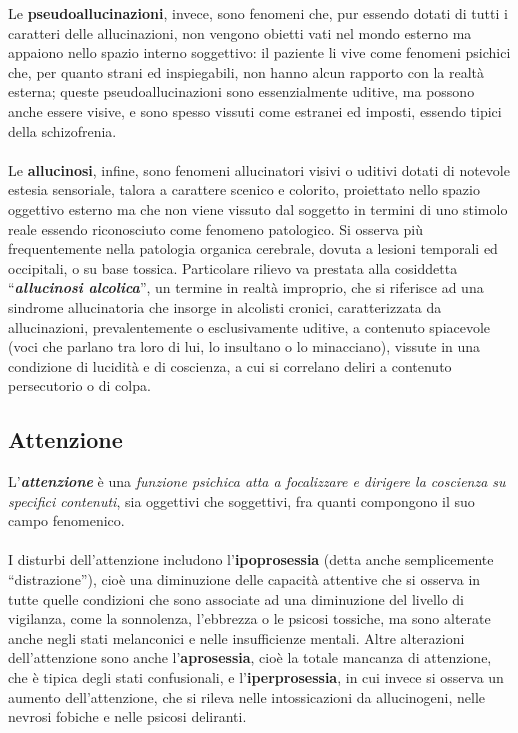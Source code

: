Le \textbf{pseudoallucinazioni}, invece, sono fenomeni che, pur essendo
dotati di tutti i caratteri delle allucinazioni, non vengono obietti
vati nel mondo esterno ma appaiono nello spazio interno soggettivo: il
paziente li vive come fenomeni psichici che, per quanto strani ed
inspiegabili, non hanno alcun rapporto con la realtà esterna; queste
pseudoallucinazioni sono essenzialmente uditive, ma possono anche essere
visive, e sono spesso vissuti come estranei ed imposti, essendo tipici
della schizofrenia.
\\\\
Le \textbf{allucinosi}, infine, sono fenomeni allucinatori visivi o
uditivi dotati di notevole estesia sensoriale, talora a carattere
scenico e colorito, proiettato nello spazio oggettivo esterno ma che non
viene vissuto dal soggetto in termini di uno stimolo reale essendo
riconosciuto come fenomeno patologico. Si osserva più frequentemente
nella patologia organica cerebrale, dovuta a lesioni temporali ed
occipitali, o su base tossica. Particolare rilievo va prestata alla
cosiddetta ``\textbf{\emph{allucinosi alcolica}}'', un termine in realtà
improprio, che si riferisce ad una sindrome allucinatoria che insorge in
alcolisti cronici, caratterizzata da allucinazioni, prevalentemente o
esclusivamente uditive, a contenuto spiacevole (voci che parlano tra
loro di lui, lo insultano o lo minacciano), vissute in una condizione di
lucidità e di coscienza, a cui si correlano deliri a contenuto
persecutorio o di colpa.

\subsection{Attenzione}

L'\textbf{\emph{attenzione}} è una \emph{funzione psichica atta a
focalizzare e dirigere la coscienza su specifici contenuti}, sia
oggettivi che soggettivi, fra quanti compongono il suo campo fenomenico.
\\\\
I disturbi dell'attenzione includono l'\textbf{ipoprosessia} (detta
anche semplicemente ``distrazione''), cioè una diminuzione delle
capacità attentive che si osserva in tutte quelle condizioni che sono
associate ad una diminuzione del livello di vigilanza, come la
sonnolenza, l'ebbrezza o le psicosi tossiche, ma sono alterate anche
negli stati melanconici e nelle insufficienze mentali. Altre alterazioni
dell'attenzione sono anche l'\textbf{aprosessia}, cioè la totale
mancanza di attenzione, che è tipica degli stati confusionali, e
l'\textbf{iperprosessia}, in cui invece si osserva un aumento
dell'attenzione, che si rileva nelle intossicazioni da allucinogeni,
nelle nevrosi fobiche e nelle psicosi deliranti.

